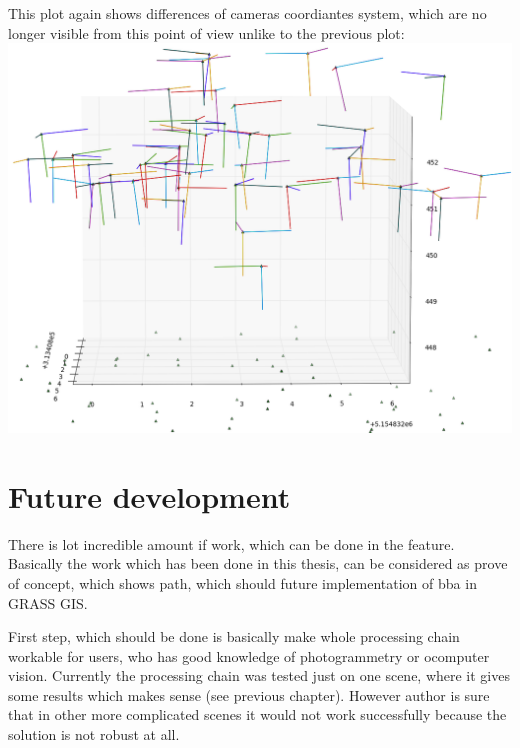 \documentclass[a4paper,12pt]{report}
\begin{document}
This plot again shows differences of cameras coordiantes system, which are no longer visible from this point of view
unlike to the previous plot:
\includegraphics[scale=0.4]{figures/result.png}


\chapter{Future development}

There is lot incredible amount if  work, which can be done in the feature. 
Basically the work which has been done in this thesis, can be considered as prove of concept,
which shows path, which should future implementation of bba in GRASS GIS.


First step, which should be done is basically make whole processing chain workable for users, who 
has good knowledge of photogrammetry or ocomputer vision. Currently  the processing chain was tested 
just on one scene, where it gives some results which makes sense (see previous chapter). However 
author is sure that in other more complicated scenes it would not work successfully because 
the solution is not robust at all.
\end{document}
